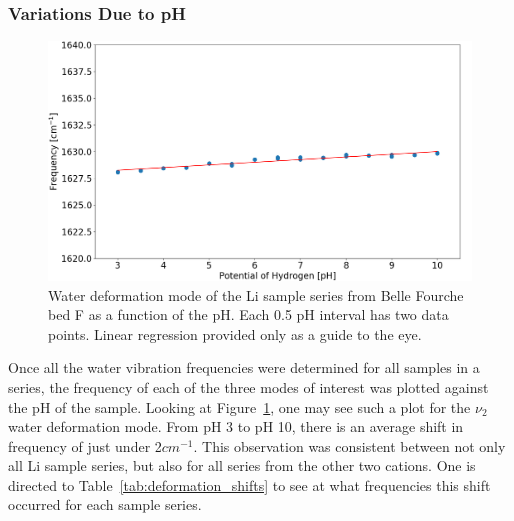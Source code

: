 \subsubsection{Variations Due to pH}
\begin{figure}
	\centering
	\includegraphics[scale=0.5]{images/deformation_shift.png}
	\caption{Water deformation mode of the Li sample series from Belle Fourche bed F as a function of the pH. Each 0.5 pH interval has two data points. Linear regression provided only as a guide to the eye.}
	\label{fig:deformation_shift}
\end{figure}
Once all the water vibration frequencies were determined for all samples in a series, the frequency of each of the three modes of interest was plotted against the pH of the sample. Looking at Figure~\ref{fig:deformation_shift}, one may see such a plot for the $\nu_2$ water deformation mode. From pH 3 to pH 10, there is an average shift in frequency of just under 2$cm^{-1}$. This observation was consistent between not only all Li sample series, but also for all series from the other two cations. One is directed to Table~\ref{tab:deformation_shifts} to see at what frequencies this shift occurred for each sample series.
